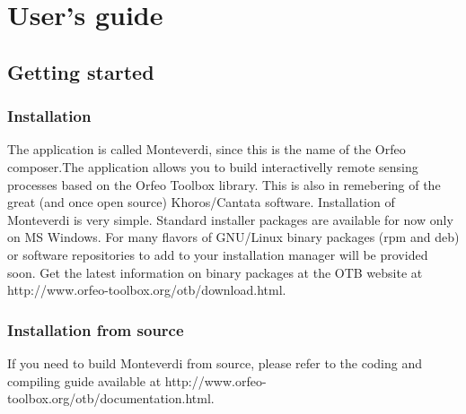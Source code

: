 \documentclass{InsightSoftwareGuide}
\begin{document}
%
%


%
\pagestyle{normal}
%
\small
\tableofcontents
\listoffigures
\listoftables
\normalsize




%
%

\mainmatter

\part{User's guide}\label{part:userguide}

\chapter{Getting started}

\section{Installation}
The application is called Monteverdi, since this is the name of the Orfeo composer.The application allows you to build 
interactivelly remote sensing processes based on the Orfeo Toolbox library. This is also in remebering of the great 
(and once open source) Khoros/Cantata software.
Installation of Monteverdi is very simple. Standard installer packages are available for now only on MS Windows. 
For many flavors of GNU/Linux binary packages (rpm and deb) or software repositories
to add to your installation manager will be provided soon. Get the latest information on binary packages at
the OTB website at http://www.orfeo-toolbox.org/otb/download.html.

\section{Installation from source}
If you need to build Monteverdi from source, please refer to the coding and compiling guide available at
http://www.orfeo-toolbox.org/otb/documentation.html.
\end{document}
